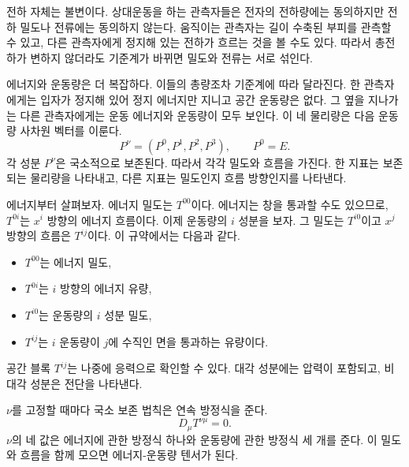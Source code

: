 전하 자체는 불변이다. 상대운동을 하는 관측자들은 전자의 전하량에는 동의하지만 전하 밀도나 전류에는 동의하지 않는다. 움직이는 관측자는 길이 수축된 부피를 관측할 수 있고, 다른 관측자에게 정지해 있는 전하가 흐르는 것을 볼 수도 있다. 따라서 총전하가 변하지 않더라도 기준계가 바뀌면 밀도와 전류는 서로 섞인다.

에너지와 운동량은 더 복잡하다. 이들의 총량조차 기준계에 따라 달라진다. 한 관측자에게는 입자가 정지해 있어 정지 에너지만 지니고 공간 운동량은 없다. 그 옆을 지나가는 다른 관측자에게는 운동 에너지와 운동량이 모두 보인다. 이 네 물리량은 다음 운동량 사차원 벡터를 이룬다.
\begin{equation}
 P^\nu=(P^0,P^1,P^2,P^3),
 \qquad P^0=E.
\end{equation}
각 성분 \(P^\nu\)은 국소적으로 보존된다. 따라서 각각 밀도와 흐름을 가진다. 한 지표는 보존되는 물리량을 나타내고, 다른 지표는 밀도인지 흐름 방향인지를 나타낸다.

에너지부터 살펴보자. 에너지 밀도는 \(T^{00}\)이다. 에너지는 창을 통과할 수도 있으므로, \(T^{0i}\)는 \(x^i\) 방향의 에너지 흐름이다. 이제 운동량의 \(i\) 성분을 보자. 그 밀도는 \(T^{i0}\)이고 \(x^j\) 방향의 흐름은 \(T^{ij}\)이다. 이 규약에서는 다음과 같다.
\begin{itemize}
 \item \(T^{00}\)는 에너지 밀도,
 \item \(T^{0i}\)는 \(i\) 방향의 에너지 유량,
 \item \(T^{i0}\)는 운동량의 \(i\) 성분 밀도,
 \item \(T^{ij}\)는 \(i\) 운동량이 \(j\)에 수직인 면을 통과하는 유량이다.
\end{itemize}
공간 블록 \(T^{ij}\)는 나중에 응력으로 확인할 수 있다. 대각 성분에는 압력이 포함되고, 비대각 성분은 전단을 나타낸다.

\begin{classroomqa}
\end{classroomqa}

\(\nu\)를 고정할 때마다 국소 보존 법칙은 연속 방정식을 준다.
\begin{equation}
 D_\mu T^{\nu\mu}=0.
 \label{eq:stress-continuity}
\end{equation}
\(\nu\)의 네 값은 에너지에 관한 방정식 하나와 운동량에 관한 방정식 세 개를 준다. 이 밀도와 흐름을 함께 모으면 에너지-운동량 텐서가 된다.

